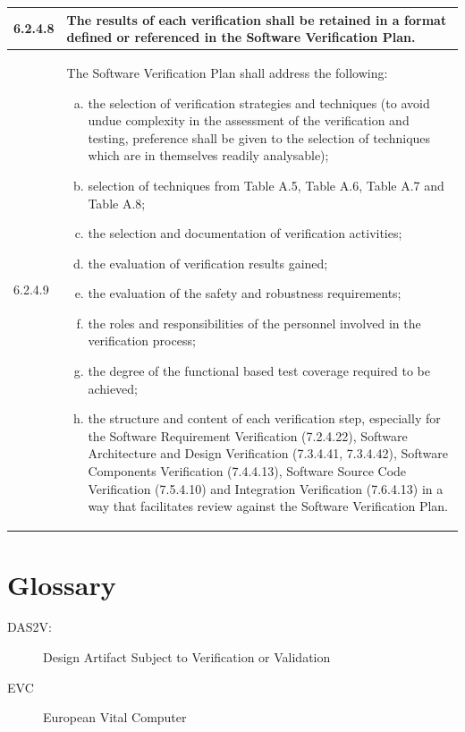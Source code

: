 \documentclass{template/openetcs_report}
\begin{document}
{\begin{longtable}{||p{}|p{}||}
    \\
    \hline 6.2.4.8 & The results of each verification shall be
    retained in a format defined or referenced in the Software
    Verification Plan.
    \\
    \hline 6.2.4.9 & The Software Verification Plan shall address the
    following:
    \begin{enumerate}[a)]
    \item the selection of verification strategies and techniques (to
      avoid undue complexity in the assessment of the verification and
      testing, preference shall be given to the selection of
      techniques which are in themselves readily analysable);
    \item selection of techniques from Table A.5, Table A.6, Table A.7
      and Table A.8;
    \item  the selection and documentation of verification activities;  
    \item  the evaluation of verification results gained;   
    \item  the evaluation of the safety and robustness requirements;  
    \item the roles and responsibilities of the personnel involved in
      the verification process;
    \item the degree of the functional based test coverage required to
      be achieved;
    \item the structure and content of each verification step,
      especially for the Software Requirement Verification (7.2.4.22),
      Software Architecture and Design Verification (7.3.4.41,
      7.3.4.42), Software Components Verification (7.4.4.13), Software
      Source Code Verification (7.5.4.10) and Integration Verification
      (7.6.4.13) in a way that facilitates review against the Software
      Verification Plan.
    \end{enumerate}
    \\
    \hline
\end{longtable}}


\section{Glossary}
\label{sec:glossary}

\begin{description}
\item [DAS2V:] Design Artifact Subject to Verification or Validation
\item[EVC] European Vital Computer
\end{description}






\nocite{*}
\end{document}

